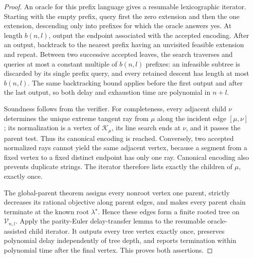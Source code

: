 \documentclass{article}
\begin{document}
\begin{proof}
An oracle for this prefix language gives a resumable lexicographic iterator. Starting with the empty prefix, query first the zero extension and then the one extension, descending only into prefixes for which the oracle answers yes. At length \(b(n,l)\), output the endpoint associated with the accepted encoding. After an output, backtrack to the nearest prefix having an unvisited feasible extension and repeat. Between two successive accepted leaves, the search traverses and queries at most a constant multiple of \(b(n,l)\) prefixes: an infeasible subtree is discarded by its single prefix query, and every retained descent has length at most \(b(n,l)\). The same backtracking bound applies before the first output and after the last output, so both delay and exhaustion time are polynomial in \(n+l\).

Soundness follows from the verifier. For completeness, every adjacent child \(\nu\) determines the unique extreme tangent ray from \(\mu\) along the incident edge \([\mu,\nu]\); its normalization is a vertex of \(\mathcal K_\mu\), its line search ends at \(\nu\), and it passes the parent test. Thus its canonical encoding is reached. Conversely, two accepted normalized rays cannot yield the same adjacent vertex, because a segment from a fixed vertex to a fixed distinct endpoint has only one ray. Canonical encoding also prevents duplicate strings. The iterator therefore lists exactly the children of \(\mu\), exactly once.

The global-parent theorem assigns every nonroot vertex one parent, strictly decreases its rational objective along parent edges, and makes every parent chain terminate at the known root \(\lambda^\star\). Hence these edges form a finite rooted tree on \(\mathcal V_{n,l}\). Apply the parity-Euler delay-transfer lemma to the resumable oracle-assisted child iterator. It outputs every tree vertex exactly once, preserves polynomial delay independently of tree depth, and reports termination within polynomial time after the final vertex. This proves both assertions.
\end{proof}
\end{document}
